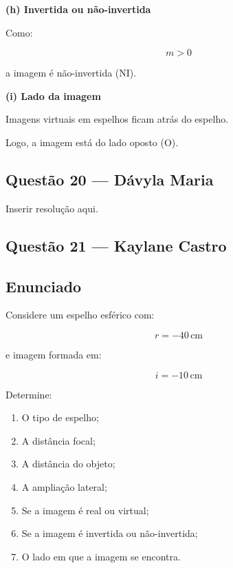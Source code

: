 \documentclass[12pt,a4paper]{article}
\begin{document}
\vspace{0.5cm}

\textbf{(h) Invertida ou não-invertida}

Como:

\[
m>0
\]

a imagem é não-invertida (NI).

\vspace{0.5cm}

\textbf{(i) Lado da imagem}

Imagens virtuais em espelhos ficam atrás do espelho.

Logo, a imagem está do lado oposto (O).

\subsection{Questão 20 — Dávyla Maria}
Inserir resolução aqui.

\subsection{Questão 21 — Kaylane Castro}


\subsection*{Enunciado}

Considere um espelho esférico com:

\[
r = -40\,\text{cm}
\]

e imagem formada em:

\[
i = -10\,\text{cm}
\]

Determine:

\begin{enumerate}
    \item[\textbf{(a)}] O tipo de espelho;
    \item[\textbf{(b)}] A distância focal;
    \item[\textbf{(d)}] A distância do objeto;
    \item[\textbf{(f)}] A ampliação lateral;
    \item[\textbf{(g)}] Se a imagem é real ou virtual;
    \item[\textbf{(h)}] Se a imagem é invertida ou não-invertida;
    \item[\textbf{(i)}] O lado em que a imagem se encontra.
\end{enumerate}

\end{document}
